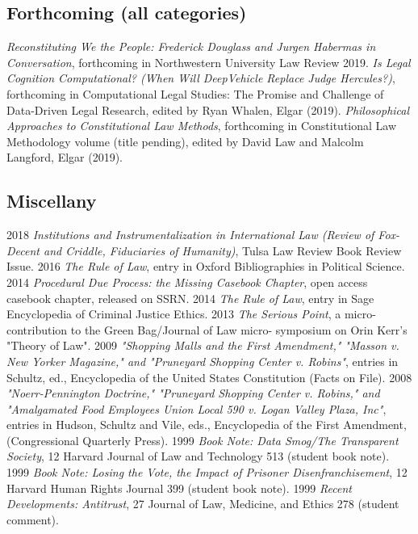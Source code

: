 \documentclass[letterpaper]{moderncv}
\begin{document}
\subsection{Forthcoming (all categories)}
\cvitem
{}
{\textit{Reconstituting We the People: Frederick Douglass and Jurgen Habermas in Conversation}, forthcoming in Northwestern University Law Review 2019.}
\vspace{1mm}
\cvitem
{}
{\textit{Is Legal Cognition Computational? (When Will DeepVehicle Replace Judge Hercules?)}, forthcoming in Computational Legal Studies: The Promise and Challenge of Data-Driven Legal Research, edited by Ryan Whalen, Elgar (2019).}
\vspace{1mm}
\cvitem
{}
{\textit{Philosophical Approaches to Constitutional Law Methods}, forthcoming in Constitutional Law Methodology volume (title pending), edited by David Law and Malcolm Langford, Elgar (2019).}
\vspace{1mm}

\subsection{Miscellany}
\cvitem
{2018}
{\textit{Institutions and Instrumentalization in International Law (Review of Fox-Decent and Criddle, Fiduciaries of Humanity)}, Tulsa Law Review Book Review Issue.}
\vspace{1mm}
\cvitem
{2016}
{\textit{The Rule of Law}, entry in Oxford Bibliographies in Political Science.}
\vspace{1mm}
\cvitem
{2014}
{\textit{Procedural Due Process: the Missing Casebook Chapter}, open access casebook chapter, released on SSRN.}
\vspace{1mm}
\cvitem
{2014}
{\textit{The Rule of Law}, entry in Sage Encyclopedia of Criminal Justice Ethics.}
\vspace{1mm}
\cvitem
{2013}
{\textit{The Serious Point}, a micro-contribution to the Green Bag/Journal of Law micro- symposium on Orin Kerr's "Theory of Law".}
\vspace{1mm}
\cvitem
{2009}
{\textit{"Shopping Malls and the First Amendment," "Masson v. New Yorker Magazine," and "Pruneyard Shopping Center v. Robins"}, entries in Schultz, ed., Encyclopedia of the United States Constitution (Facts on File).}
\vspace{1mm}
\cvitem
{2008}
{\textit{"Noerr-Pennington Doctrine," "Pruneyard Shopping Center v. Robins," and "Amalgamated Food Employees Union Local 590 v. Logan Valley Plaza, Inc"}, entries in Hudson, Schultz and Vile, eds., Encyclopedia of the First Amendment, (Congressional Quarterly Press).}
\vspace{1mm}
\cvitem
{1999}
{\textit{Book Note: Data Smog/The Transparent Society}, 12 Harvard Journal of Law and Technology 513 (student book note).}
\vspace{1mm}
\cvitem
{1999}
{\textit{Book Note: Losing the Vote, the Impact of Prisoner Disenfranchisement}, 12 Harvard Human Rights Journal 399 (student book note).}
\vspace{1mm}
\cvitem
{1999}
{\textit{Recent Developments: Antitrust}, 27 Journal of Law, Medicine, and Ethics 278 (student comment).}
\vspace{1mm}
\end{document}
